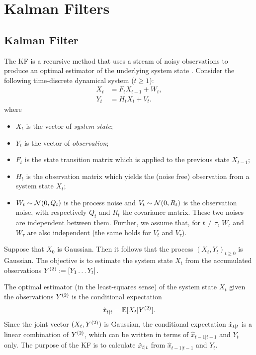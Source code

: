 \chapter{Kalman Filters}
\section{Kalman Filter}
\label{sec:KalmanFilter} The KF is a recursive method that uses a
stream of noisy observations to produce an optimal estimator of
the underlying system state \cite{kalman}. Consider the following
time-discrete dynamical system ($t\geq 1$):
\begin{align}
  \label{eq:Dynamic_system}
  X_t &= F_tX_{t-1}+W_t , \\ %
  Y_t &= H_tX_t+V_t .%
\end{align}
where
\begin{itemize}
\item $X_t$ is the vector of \emph{system state}; \item $Y_t$ is
the vector of \emph{observation}; \item $F_t$ is the state
transition matrix which is applied to the previous state
  $X_{t-1}$;
\item $H_t$ is the observation matrix which yields the (noise
free) observation from
  a system state $X_t$;
\item $W_t\sim\mathcal{N}(0, Q_t)$ is the process noise and
$V_t\sim\mathcal{N}(0, R_t)$ is
  the observation noise, with respectively $Q_t$ and $R_t$ the covariance
  matrix. These two noises are independent between them. Further, we assume that, for $t\neq \tau$, $W_t$ and $W_\tau$ are also independent
  (the same holds for $V_t$ and $V_\tau$).
\end{itemize}
Suppose that $X_0$ is Gaussian. Then it follows that the process
$(X_t,Y_t)_{t\geq 0}$ is Gaussian.  The objective is to estimate
the system state $X_t$ from the accumulated observations
$Y^{(2)}:=[Y_1\ldots Y_t]$.


The optimal estimator (in the least-squares sense) of the system
state $X_t$ given the observations $Y^{(2)}$ is the conditional
expectation
\begin{align}
  \label{eq:conditional_estimator}
  \hat{x}_{t|t} = \mathbb{E}[{X_t|Y^{(2)}}].
\end{align}
Since the joint vector $(X_t,Y^{(2)})$ is Gaussian, the conditional
expectation $\hat{x}_{t|t}$ is a linear combination of $Y^{(2)}$, which can be
written in terms of $\hat{x}_{t-1|t-1}$ and $Y_t$ only. The
purpose of the KF is to calculate $\hat{x}_{t|t}$ from $\hat{x}_{t-1|t-1}$
and $Y_t$.

